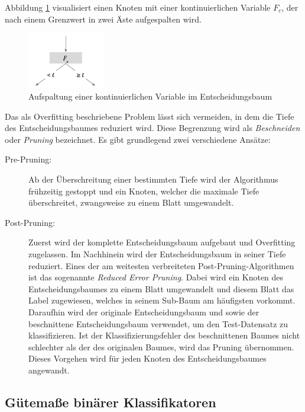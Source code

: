 Abbildung \ref{img:continuos_variable} visualisiert einen Knoten mit einer kontinuierlichen Variable $F_c$, der nach einem Grenzwert in zwei Äste aufgespalten wird.


\begin{figure}[h]
	\centering
	\includegraphics[width=0.3\textwidth]{bilder/continuos_variable.png}
	\caption{Aufspaltung einer kontinuierlichen Variable im Entscheidungsbaum}
	\label{img:continuos_variable}
\end{figure}


Das als Overfitting beschriebene Problem lässt sich vermeiden, in dem die Tiefe des Entscheidungsbaumes reduziert wird. Diese Begrenzung wird als \emph{Beschneiden} oder \emph{Pruning} bezeichnet. Es gibt grundlegend zwei verschiedene Ansätze:

\begin{description}
 \item[Pre-Pruning:] Ab der Überschreitung einer bestimmten Tiefe wird der Algorithmus frühzeitig gestoppt und ein Knoten, welcher die maximale Tiefe überschreitet, zwangsweise zu einem Blatt umgewandelt. \item[Post-Pruning:] Zuerst wird der komplette Entscheidungsbaum aufgebaut und Overfitting zugelassen. Im Nachhinein wird der Entscheidungsbaum in seiner Tiefe reduziert. Eines der am weitesten verbreiteten Post-Pruning-Algorithmen ist das sogenannte \emph{Reduced Error Pruning}. Dabei wird ein Knoten des Entscheidungsbaumes zu einem Blatt umgewandelt und diesem Blatt das Label zugewiesen, welches in seinem Sub-Baum am häufigsten vorkommt. Daraufhin wird der originale Entscheidungsbaum und sowie der beschnittene Entscheidungsbaum verwendet, um den Test-Datensatz zu klassifizieren. Ist der Klassifizierungsfehler des beschnittenen Baumes nicht schlechter als der des originalen Baumes, wird das Pruning übernommen. Dieses Vorgehen wird für jeden Knoten des Entscheidungsbaumes angewandt. \cite[S. 68 - 70]{machine_mitchell} 
\end{description}


\subsection{Gütemaße binärer Klassifikatoren}
\label{sec:howGoodIsMyClassifier}


